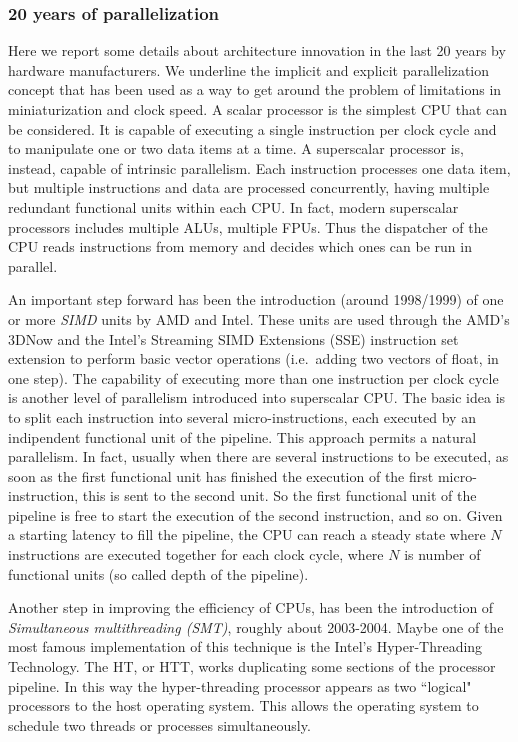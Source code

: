 \subsubsection{20 years of parallelization}
\label{sec:paralstory}
Here we report some details about architecture innovation in the last 
20 years by hardware manufacturers. We underline the implicit and explicit 
parallelization concept that has been used as a way to get around the 
problem of limitations in miniaturization and clock speed.
A scalar processor is the simplest CPU that can be considered. It is capable
of executing a single instruction per clock cycle and to manipulate one or 
two data items at a time.  A superscalar processor is, instead, capable 
of intrinsic parallelism. Each instruction processes one data item, but 
multiple instructions and data are processed concurrently, having 
multiple redundant functional units within each CPU. In fact, modern 
superscalar processors includes multiple ALUs, multiple FPUs. 
Thus the dispatcher of the CPU reads instructions from memory and decides 
which ones can be run in parallel. 

An important step forward has been the introduction (around 1998/1999)  
of one or more {\em SIMD} units by AMD and Intel. These units are 
used through the AMD's 3DNow and the Intel's Streaming SIMD Extensions 
(SSE) instruction set extension  to perform
basic vector operations (i.e.\ adding two vectors of float, in one step).
The capability of executing more than one instruction per clock cycle 
is another level of parallelism introduced into superscalar CPU. The 
basic idea is to split each instruction into several micro-instructions, 
each executed by an indipendent functional unit of the pipeline.
This approach permits a natural parallelism. In fact, usually  when there are
several instructions to be executed, as soon as the first functional unit
has finished the execution of the first micro-instruction, this is sent to
the second unit. So the first functional unit of the pipeline is free 
to start the execution of the second instruction, and so on.
Given a starting latency to fill the pipeline, the CPU can reach a 
steady state where $N$ instructions are executed together for 
each clock cycle, where $N$ is number of functional units 
(so called depth of the pipeline).

Another step in improving the efficiency of CPUs, has been the 
introduction of {\em Simultaneous multithreading (SMT)}, roughly about 
2003-2004. Maybe one of the most famous implementation of 
this technique is the Intel's Hyper-Threading Technology. The HT, 
or HTT, works duplicating some sections of the processor pipeline. 
In this way the hyper-threading processor appears as two ``logical" 
processors to the host operating system. This allows the operating 
system to schedule two threads or processes simultaneously.

